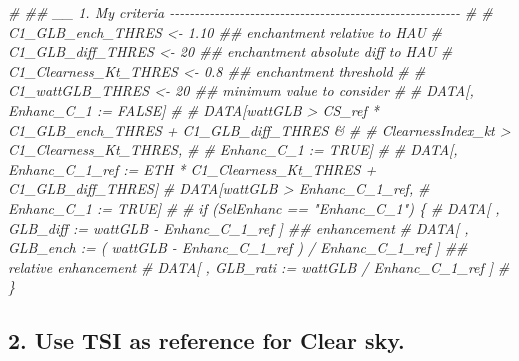 \documentclass[
  10pt,
  a4paper,oneside]{article}
\newenvironment{Shaded}{\begin{snugshade}}{\end{snugshade}}
\newcommand{\CommentTok}[1]{\textcolor[rgb]{0.56,0.35,0.01}{\textit{#1}}}
\begin{document}
\begin{Shaded}
\begin{Highlighting}[]
\CommentTok{\# \#\# \_\_ 1. My criteria  {-}{-}{-}{-}{-}{-}{-}{-}{-}{-}{-}{-}{-}{-}{-}{-}{-}{-}{-}{-}{-}{-}{-}{-}{-}{-}{-}{-}{-}{-}{-}{-}{-}{-}{-}{-}{-}{-}{-}{-}{-}{-}{-}{-}{-}{-}{-}{-}{-}{-}{-}{-}{-}{-}{-}{-}{-}{-}}
\CommentTok{\# \# C1\_GLB\_ench\_THRES     \textless{}{-}  1.10 \#\# enchantment relative to HAU}
\CommentTok{\# C1\_GLB\_diff\_THRES     \textless{}{-} 20    \#\# enchantment absolute diff to HAU}
\CommentTok{\# C1\_Clearness\_Kt\_THRES \textless{}{-}  0.8  \#\# enchantment threshold}
\CommentTok{\# \# C1\_wattGLB\_THRES      \textless{}{-} 20    \#\# minimum value to consider}
\CommentTok{\#}
\CommentTok{\# DATA[, Enhanc\_C\_1 := FALSE]}
\CommentTok{\# \# DATA[wattGLB           \textgreater{} CS\_ref * C1\_GLB\_ench\_THRES + C1\_GLB\_diff\_THRES \&}
\CommentTok{\# \#      ClearnessIndex\_kt \textgreater{} C1\_Clearness\_Kt\_THRES,}
\CommentTok{\# \#      Enhanc\_C\_1 := TRUE]}
\CommentTok{\#}
\CommentTok{\# DATA[, Enhanc\_C\_1\_ref := ETH * C1\_Clearness\_Kt\_THRES + C1\_GLB\_diff\_THRES]}
\CommentTok{\# DATA[wattGLB \textgreater{} Enhanc\_C\_1\_ref,}
\CommentTok{\#      Enhanc\_C\_1 := TRUE]}
\CommentTok{\#}
\CommentTok{\# if (SelEnhanc == "Enhanc\_C\_1") \{}
\CommentTok{\#   DATA[ , GLB\_diff :=   wattGLB {-} Enhanc\_C\_1\_ref                    ] \#\# enhancement}
\CommentTok{\#   DATA[ , GLB\_ench := ( wattGLB {-} Enhanc\_C\_1\_ref ) / Enhanc\_C\_1\_ref ] \#\# relative enhancement}
\CommentTok{\#   DATA[ , GLB\_rati :=   wattGLB / Enhanc\_C\_1\_ref                    ]}
\CommentTok{\# \}}
\end{Highlighting}
\end{Shaded}

\hypertarget{use-tsi-as-reference-for-clear-sky.-1}{%
\subsection{2. Use TSI as reference for Clear sky.}\label{use-tsi-as-reference-for-clear-sky.-1}}
\end{document}
